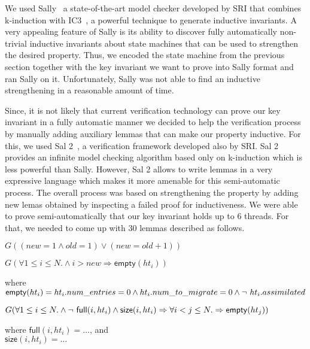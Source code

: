 We used Sally~\cite{sally} a state-of-the-art model checker developed
by SRI that combines k-induction with IC3~\cite{Bradley11}, a powerful
technique to generate inductive invariants. A very appealing feature
of Sally is its ability to discover fully automatically non-trivial
inductive invariants about state machines that can be used to
strengthen the desired property.
%
Thus, we encoded the state machine from the previous section together
with the key invariant we want to prove into Sally format and ran
Sally on it. Unfortunately, Sally was not able to find an inductive
strengthening in a reasonable amount of time.

Since, it is not likely that current verification technology can prove
our key invariant in a fully automatic manner we decided to help the
verification process by manually adding auxiliary lemmas that can make
our property inductive.
%
For this, we used Sal 2~\cite{sal2}, a verification framework
developed also by SRI. Sal 2 provides an infinite model checking
algorithm based only on k-induction which is less powerful than
Sally. However, Sal 2 allows to write lemmas in a very expressive
language which makes it more amenable for this semi-automatic
process. The overall process was based on strengthening the property
by adding new lemas obtained by inspecting a failed proof for
inductiveness. We were able to prove semi-automatically that our key
invariant holds up to 6 threads. For that, we needed to come up with
30 lemmas described as follows.

\begin{lemma} %
  $G((new = 1 \wedge old = 1) \vee (new = old+1))$
\end{lemma}

\begin{lemma} %
  $G(\forall 1 \leq i \leq N.  \wedge i > new \Rightarrow \mathsf{empty}(ht_i))$

  \noindent where $\mathsf{empty}(ht_i)= ht_i.num\_entries = 0 \wedge
  ht_i.num\_to\_migrate = 0 \wedge \mbox{$\neg\ ht_i.assimilated$}$
  
\end{lemma}  

\begin{lemma} %
 $G(\forall 1 \leq i \leq N.  \wedge \mbox{$\neg\ \mathsf{full}(i, ht_i)$}
  \wedge \mathsf{size}(i,ht_i) \Rightarrow \forall i < j \leq N.
  \Rightarrow \mathsf{empty}(ht_j))$
\end{lemma}  

\noindent where $\mathsf{full}(i, ht_i)= \ldots$, and \\
$\mathsf{size}(i, ht_i)=\ldots$

